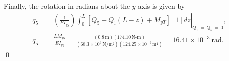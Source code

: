 \documentclass{AeroStructure-ERJohnson}
\begin{document}
\begin{example*}
\begin{equation*}
\end{equation*}
Finally, the rotation in radians about the $y$-axis is given\vspace*{-3pt} by
\begin{align}
q_{5}&=\left.\left(\frac{1}{E I_{y y}}\right)\int_{0}^{L}\left[Q_{5}-Q_{1}(L-z)+M_{y T}\right][1] d z\right|_{Q_{1}\,=\,Q_{5}\,=\,0},\nonumber\\
q_{5}&=\frac{L M_{y T}}{E I_{y y}}=\frac{(0.8\,\mathrm{m})(174.10\,\mathrm{N}\mbox{-}\mathrm{m})}{\left(68.3 \times 10^{9}\,\mathrm{N} / \mathrm{m}^{2}\right)\left(124.25 \times 10^{-9}\,\mathrm{m}^{4}\right)}=16.41 \times 10^{-3}~\mbox{rad.} \tag{p}
\end{align}\hfill\qed
\end{example*}

\vspace*{-2pc}
\end{document}
